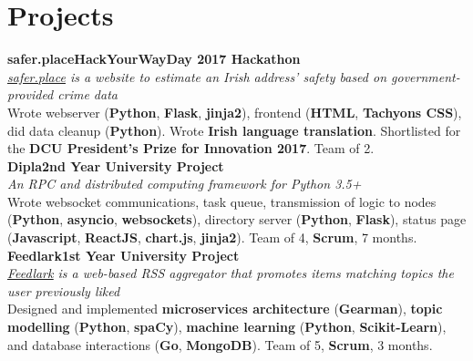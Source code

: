 \documentclass[a4paper, oneside, final]{scrartcl}
\newcommand{\nasc}[2]{\href{#1}{\color{blue}\setulcolor{blue}\ul{#2}}}
\newcommand{\bearna}[0]{\vspace{2.25mm}\\}
\newcommand{\fmtjobtitle}[1]{\textbf{#1}}
\newcommand{\fmtblurb}[1]{\textit{#1}}
\newcommand{\fmtskill}[1]{\textbf{#1}}
\begin{document}
\section{Projects}
\fmtjobtitle{safer.place\hfill HackYourWayDay 2017 Hackathon}\\
\fmtblurb{\nasc{http://safer.place}{safer.place} is a website to estimate an Irish address’ safety based on government-provided crime data}\\
Wrote webserver (\fmtskill{Python}, \fmtskill{Flask}, \fmtskill{jinja2}), frontend (\fmtskill{HTML}, \fmtskill{Tachyons CSS}), did data cleanup (\fmtskill{Python}). Wrote \fmtskill{Irish language
translation}. Shortlisted for the \fmtskill{DCU President’s Prize for Innovation 2017}. Team of 2.
\bearna
\fmtjobtitle{Dipla\hfill 2nd Year University Project}\\
\fmtblurb{An RPC and distributed computing framework for Python 3.5+}\\
Wrote websocket communications, task queue, transmission of logic to nodes (\fmtskill{Python}, \fmtskill{asyncio}, \fmtskill{websockets}), directory server (\fmtskill{Python}, \fmtskill{Flask}), status page (\fmtskill{Javascript}, \fmtskill{ReactJS}, \fmtskill{chart.js}, \fmtskill{jinja2}). Team of 4, \fmtskill{Scrum}, 7 months.
\bearna
\fmtjobtitle{Feedlark\hfill 1st Year University Project}\\
\fmtblurb{\nasc{https://cpssd.net/feedlark}{Feedlark} is a web-based RSS aggregator that promotes items matching topics the user previously liked}\\
Designed and implemented \fmtskill{microservices architecture} (\fmtskill{Gearman}), \fmtskill{topic modelling} (\fmtskill{Python}, \fmtskill{spaCy}), \fmtskill{machine learning}
(\fmtskill{Python}, \fmtskill{Scikit-Learn}), and database interactions (\fmtskill{Go}, \fmtskill{MongoDB}). Team of 5, \fmtskill{Scrum}, 3 months.
\end{document}
